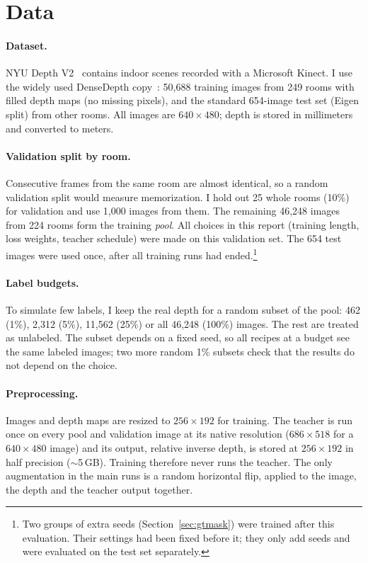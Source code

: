 \documentclass[11pt]{article}
\begin{document}
\section{Data}

\paragraph{Dataset.} NYU Depth V2~\cite{silberman2012} contains indoor scenes recorded with a
Microsoft Kinect. I use the widely used DenseDepth copy~\cite{alhashim2018}: 50,688 training
images from 249 rooms with filled depth maps (no missing pixels), and the standard 654-image test
set (Eigen split) from other rooms. All images are $640\times480$; depth is stored in millimeters
and converted to meters.

\paragraph{Validation split by room.} Consecutive frames from the same room are almost identical,
so a random validation split would measure memorization. I hold out 25 whole rooms (10\%) for
validation and use 1,000 images from them. The remaining 46,248 images from 224 rooms form the
training \emph{pool}. All choices in this report (training length, loss weights, teacher schedule)
were made on this validation set. The 654 test images were used once, after all training runs had
ended.\footnote{Two groups of extra seeds (Section~\ref{sec:gtmask}) were trained after this
evaluation. Their settings had been fixed before it; they only add seeds and were evaluated on the
test set separately.}

\paragraph{Label budgets.} To simulate few labels, I keep the real depth for a random subset of
the pool: 462 (1\%), 2,312 (5\%), 11,562 (25\%) or all 46,248 (100\%) images. The rest are treated
as unlabeled. The subset depends on a fixed seed, so all recipes at a budget see the same labeled
images; two more random 1\% subsets check that the results do not depend on the choice.

\paragraph{Preprocessing.} Images and depth maps are resized to $256\times192$ for training. The
teacher is run once on every pool and validation image at its native resolution ($686\times518$
for a $640\times480$ image) and its output, relative inverse depth, is stored at $256\times192$
in half precision ($\sim$5\,GB). Training therefore never runs the teacher. The only augmentation
in the main runs is a random horizontal flip, applied to the image, the depth and the teacher
output together.
\end{document}
